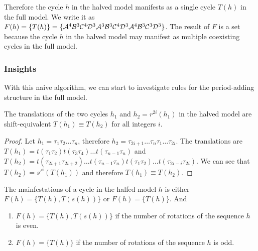 Therefore the cycle $h$ in the halved model manifests as a single cycle $T(h)$ in the full model.
We write it as $F(h) = \{T(h)\} = \{\mathcal{A}^4\mathcal{B}^3\mathcal{C}^4\mathcal{D}^3\mathcal{A}^3\mathcal{B}^3\mathcal{C}^4\mathcal{D}^3\mathcal{A}^4\mathcal{B}^3\mathcal{C}^3\mathcal{D}^3\}$.
The result of $F$ is a set because the cycle $h$ in the halved model may manifest as multiple coexisting cycles in the full model.

\subsubsection{Insights}

With this naive algorithm, we can start to investigate rules for the period-adding structure in the full model.

\begin{lemma}
	\label{lemma:equivalence.translations}
	The translations of the two cycles $h_1$ and $h_2 = r^{2i}(h_1)$ in the halved model are shift-equivalent $T(h_1) \equiv T(h_2)$ for all integers $i$.
\end{lemma}

\begin{proof}
	Let $h_1 = \tau_1\tau_2 \dots \tau_n$, therefore $h_2 = \tau_{2i+1} \dots \tau_n\tau_1 \dots \tau_{2i}$.
	The translations are $T(h_1) = t(\tau_1\tau_2)t(\tau_3\tau_4) \dots t(\tau_{n-1}\tau_n)$
	and $T(h_2) = t(\tau_{2i+1}\tau_{2i+2}) \dots t(\tau_{n-1}\tau_n)t(\tau_1\tau_2) \dots t(\tau_{2i-i}\tau_{2i})$.
	We can see that $T(h_2) = s'^i(T(h_1))$ and therefore $T(h_1) \equiv T(h_2)$.
\end{proof}

\begin{theorem}
	The mainfestations of a cycle in the halfed model $h$ is either $F(h) = \{T(h), T(s(h))\}$ or $F(h) = \{T(h)\}$.
	And \begin{enumerate}
		\item $F(h) = \{T(h), T(s(h))\}$ if the number of rotations of the sequence $h$ is even.
		\item $F(h) = \{T(h)\}$ if the number of rotations of the sequence $h$ is odd.
	\end{enumerate}
\end{theorem}

